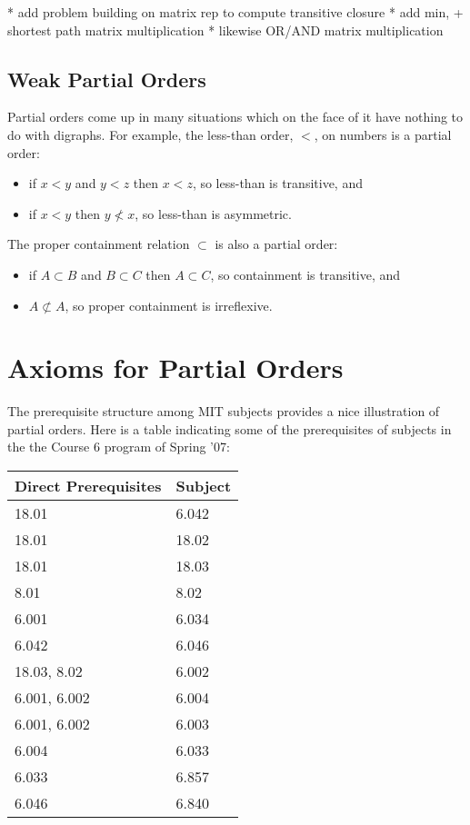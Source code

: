 \begin{editingnotes}
* add problem building on matrix rep to compute transitive closure
* add min, + shortest path matrix  multiplication
* likewise OR/AND matrix multiplication
\end{editingnotes}

\subsection{Weak Partial Orders}\label{partial_order_sec}
Partial orders come up in many situations which on the face of it have
nothing to do with digraphs.  For example, the less-than order, $<$, on
numbers is a partial order:
\begin{itemize}
\item if $x <y$ and $y < z$ then $x < z$, so less-than is transitive, and
\item  if $x <y$ then $y \not < x$, so less-than is asymmetric.
\end{itemize}
 The proper containment relation $\subset$ is also a
partial order:
\begin{itemize}
\item if $A \subset B$ and $B \subset C$ then $A \subset C$,
so containment is transitive, and
\item  $A \not\subset A$, so proper containment is irreflexive.
\end{itemize}


\iffalse
, but so is the containment relation on sets
and the divisibility relation on integers.
\fi

\iffalse

\section{Axioms for Partial Orders}

The prerequisite structure among MIT subjects provides a nice illustration
of partial orders.  Here is a table indicating some of the prerequisites of
subjects in the the Course 6 program of Spring '07:
\begin{center}
\begin{tabular}{|l|l|}
\hline
Direct Prerequisites & Subject\\ \hline
18.01 & 6.042\\ \hline
 18.01 & 18.02\\ \hline
 18.01 & 18.03\\ \hline
 8.01 & 8.02\\ \hline
 6.001 & 6.034\\ \hline
 6.042 & 6.046\\ \hline
 18.03, 8.02 & 6.002\\ \hline
 6.001, 6.002 & 6.004\\ \hline
 6.001, 6.002 & 6.003\\ \hline
 6.004 & 6.033\\ \hline
 6.033 & 6.857\\ \hline
 6.046 & 6.840\\ \hline
\end{tabular}
\end{center}

